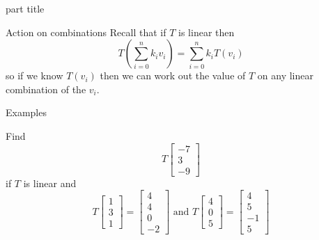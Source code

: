 \documentclass{beamer}
\begin{document}
\begin{frame}
\begin{beamercolorbox}[sep=12pt,center]{part title}
\insertsection\par
\end{beamercolorbox}
\end{frame}

\begin{frame}{Action on combinations}
Recall that if $T$ is linear then
\begin{equation*}
T\left(\sum_{i=0}^n k_i v_i\right) = \sum_{i=0}^n k_i T(v_i)
\end{equation*}
so if we know $T(v_i)$ then we can work out the value of $T$ on any linear combination of the $v_i$.
\end{frame}

\begin{frame}{Examples}
\begin{example}
	Find
	\begin{equation*}
	T \left[
	\begin{array}{c}
	-7\\
	3\\
	-9
	\end{array}
	\right]
	\end{equation*}
	if $T$ is linear and
	\begin{equation*}
	T \left[
	\begin{array}{c}
	1\\
	3\\
	1
	\end{array}
	\right] = \left[
	\begin{array}{c}
	4\\
	4\\
	0\\
	-2
	\end{array}
	\right]\text{ and } T \left[
	\begin{array}{c}
	4\\
	0\\
	5
	\end{array}
	\right] = \left[
	\begin{array}{c}
	4\\
	5\\
	-1\\
	5
	\end{array}
	\right]
	\end{equation*}
\end{example}
\end{frame}
\end{document}
